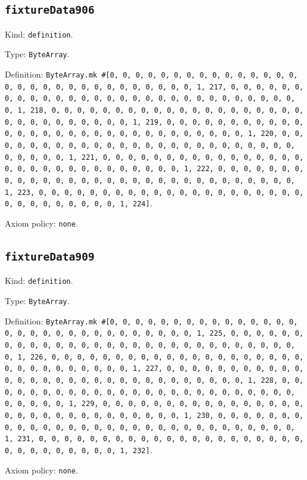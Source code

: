 \documentclass[11pt]{article}
\begin{document}
\subsection*{\texttt{fixtureData906}}
\noindent Kind: \texttt{definition}.\par
\noindent Type: \texttt{ByteArray}.\par
\noindent Definition: \texttt{ByteArray.mk \#[0, 0, 0, 0, 0, 0, 0, 0, 0, 0, 0, 0, 0, 0, 0, 0, 0, 0, 0, 0, 0, 0, 0, 0, 0, 0, 0, 0, 0, 0, 1, 217, 0, 0, 0, 0, 0, 0, 0, 0, 0, 0, 0, 0, 0, 0, 0, 0, 0, 0, 0, 0, 0, 0, 0, 0, 0, 0, 0, 0, 0, 0, 1, 218, 0, 0, 0, 0, 0, 0, 0, 0, 0, 0, 0, 0, 0, 0, 0, 0, 0, 0, 0, 0, 0, 0, 0, 0, 0, 0, 0, 0, 0, 0, 1, 219, 0, 0, 0, 0, 0, 0, 0, 0, 0, 0, 0, 0, 0, 0, 0, 0, 0, 0, 0, 0, 0, 0, 0, 0, 0, 0, 0, 0, 0, 0, 1, 220, 0, 0, 0, 0, 0, 0, 0, 0, 0, 0, 0, 0, 0, 0, 0, 0, 0, 0, 0, 0, 0, 0, 0, 0, 0, 0, 0, 0, 0, 0, 1, 221, 0, 0, 0, 0, 0, 0, 0, 0, 0, 0, 0, 0, 0, 0, 0, 0, 0, 0, 0, 0, 0, 0, 0, 0, 0, 0, 0, 0, 0, 0, 1, 222, 0, 0, 0, 0, 0, 0, 0, 0, 0, 0, 0, 0, 0, 0, 0, 0, 0, 0, 0, 0, 0, 0, 0, 0, 0, 0, 0, 0, 0, 0, 1, 223, 0, 0, 0, 0, 0, 0, 0, 0, 0, 0, 0, 0, 0, 0, 0, 0, 0, 0, 0, 0, 0, 0, 0, 0, 0, 0, 0, 0, 0, 0, 1, 224]}.\par
\noindent Axiom policy: \texttt{none}.\par
\subsection*{\texttt{fixtureData909}}
\noindent Kind: \texttt{definition}.\par
\noindent Type: \texttt{ByteArray}.\par
\noindent Definition: \texttt{ByteArray.mk \#[0, 0, 0, 0, 0, 0, 0, 0, 0, 0, 0, 0, 0, 0, 0, 0, 0, 0, 0, 0, 0, 0, 0, 0, 0, 0, 0, 0, 0, 0, 1, 225, 0, 0, 0, 0, 0, 0, 0, 0, 0, 0, 0, 0, 0, 0, 0, 0, 0, 0, 0, 0, 0, 0, 0, 0, 0, 0, 0, 0, 0, 0, 1, 226, 0, 0, 0, 0, 0, 0, 0, 0, 0, 0, 0, 0, 0, 0, 0, 0, 0, 0, 0, 0, 0, 0, 0, 0, 0, 0, 0, 0, 0, 0, 1, 227, 0, 0, 0, 0, 0, 0, 0, 0, 0, 0, 0, 0, 0, 0, 0, 0, 0, 0, 0, 0, 0, 0, 0, 0, 0, 0, 0, 0, 0, 0, 1, 228, 0, 0, 0, 0, 0, 0, 0, 0, 0, 0, 0, 0, 0, 0, 0, 0, 0, 0, 0, 0, 0, 0, 0, 0, 0, 0, 0, 0, 0, 0, 1, 229, 0, 0, 0, 0, 0, 0, 0, 0, 0, 0, 0, 0, 0, 0, 0, 0, 0, 0, 0, 0, 0, 0, 0, 0, 0, 0, 0, 0, 0, 0, 1, 230, 0, 0, 0, 0, 0, 0, 0, 0, 0, 0, 0, 0, 0, 0, 0, 0, 0, 0, 0, 0, 0, 0, 0, 0, 0, 0, 0, 0, 0, 0, 1, 231, 0, 0, 0, 0, 0, 0, 0, 0, 0, 0, 0, 0, 0, 0, 0, 0, 0, 0, 0, 0, 0, 0, 0, 0, 0, 0, 0, 0, 0, 0, 1, 232]}.\par
\noindent Axiom policy: \texttt{none}.\par
\end{document}
